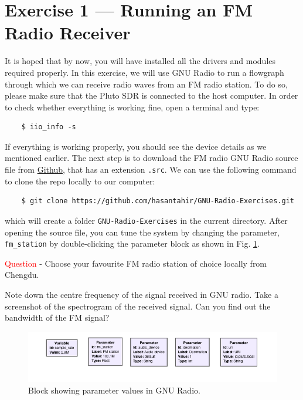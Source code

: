 \documentclass[11pt]{article}
\begin{document}
\section{Exercise 1 — Running an FM Radio Receiver}

It is hoped that by now, you will have installed all the drivers and modules required properly. In this exercise, we will use GNU Radio to run a flowgraph through which we can receive radio waves from an FM radio station. To do so, please make sure that the Pluto SDR is connected to the host computer. In order to check whether everything is working fine, open a terminal and type:

\begin{mdframed}[backgroundcolor=gray!20]
  \tiny
  \begin{verbatim}
    $ iio_info -s
  \end{verbatim}
\end{mdframed}
 
If everything is working properly, you should see the device details as we mentioned earlier. The next step is to download the FM radio GNU Radio source file from \href{https://github.com/hasantahir/GNU-Radio-Exercises}{Github}, that has an extension \texttt{.src}. We can use the following command to clone the repo locally to our computer:

\begin{mdframed}[backgroundcolor=gray!20]
  \tiny
  \begin{verbatim}
    $ git clone https://github.com/hasantahir/GNU-Radio-Exercises.git
  \end{verbatim}
\end{mdframed}

which will create a folder \texttt{GNU-Radio-Exercises} in the current directory. After opening the source file, you can tune the system by changing the parameter, \texttt{fm\_station} by double-clicking the parameter block as shown in Fig. \ref{fig:gnu_radio}. 

\begin{tcolorbox}[colback=green!5]
  \textcolor{red}{Question} - Choose your favourite FM radio station of choice locally from Chengdu. 
  \begin{outline}
    \1 Note down the centre frequency of the signal received in GNU radio.
    \1 Take a screenshot of the spectrogram of the received signal.
    \1 Can you find out the bandwidth of the FM signal?
  \end{outline}
\end{tcolorbox}


\begin{figure}[h!]
  \centering
  \includegraphics[width=\textwidth]{GNu Radio screenshot.png}
  \caption{Block showing parameter values in GNU Radio.}
  \label{fig:gnu_radio}
\end{figure}






\end{document}
